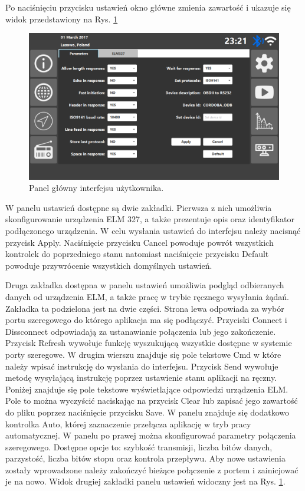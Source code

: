 \documentclass[12pt]{article} %
\numberwithin{equation}{subsection}
\numberwithin{figure}{section}
\numberwithin{table}{section}
\begin{document}
		Po naciśnięciu przycisku ustawień okno główne zmienia zawartość i ukazuje się widok przedstawiony na Rys. \ref{user_interface_dashboard}
		
		\begin{figure}[!h]
			\centering
			\includegraphics[scale=0.55]{Images/user_interface_settings_parameters_tab.png}
			\caption{Panel główny interfejsu użytkownika.}
			\label{user_interface_dashboard}
		\end{figure}		
		
		W panelu ustawień dostępne są dwie zakładki. Pierwsza z nich umożliwia skonfigurowanie urządzenia ELM 327, a także prezentuje opis oraz identyfikator podłączonego urządzenia. W celu wysłania ustawień do interfejsu należy nacisnąć przycisk Apply. Naciśnięcie przycisku Cancel powoduje powrót wszystkich kontrolek do poprzedniego stanu natomiast naciśnięcie przycisku Default powoduje przywrócenie wszystkich domyślnych ustawień.
		
		\newpage
		
		Druga zakładka dostępna w panelu ustawień umożliwia podgląd odbieranych danych od urządzenia ELM, a także pracę w trybie ręcznego wysyłania żądań. Zakładka ta podzielona jest na dwie części. Strona lewa odpowiada za wybór portu szeregowego do którego aplikacja ma się podłączyć. Przyciski Connect i Dissconnect odpowiadają za ustanawianie połączenia lub jego zakończenie. Przycisk Refresh wywołuje funkcję wyszukującą wszystkie dostępne w systemie porty szeregowe. W drugim wierszu znajduje się pole tekstowe Cmd w które należy wpisać instrukcję do wysłania do interfejsu. Przycisk Send wywołuje metodę wysyłającą instrukcję poprzez ustawienie stanu aplikacji na ręczny. Poniżej znajduje się pole tekstowe wyświetlające odpowiedzi urządzenia ELM. Pole to można wyczyścić naciskając na przycisk Clear lub zapisać jego zawartość do pliku poprzez naciśnięcie przycisku Save. W panelu znajduje się dodatkowo kontrolka Auto, której zaznaczenie przełącza aplikację w tryb pracy automatycznej. W panelu po prawej można skonfigurować parametry połączenia szeregowego. Dostępne opcje to: szybkość transmisji, liczba bitów danych, parzystość, liczba bitów stopu oraz kontrola przepływu. Aby nowe ustawienia zostały wprowadzone należy zakończyć bieżące połączenie z portem i zainicjować je na nowo. Widok drugiej zakładki panelu ustawień widoczny jest na Rys. \ref{user_interface_dashboard}.
		
\end{document}
